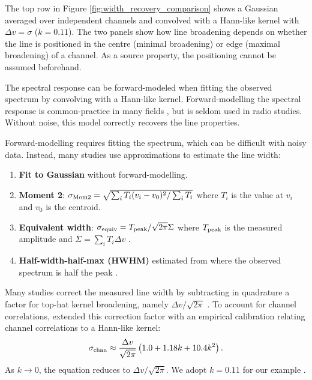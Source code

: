 \documentclass{rnaastex}
\begin{document}
The top row in Figure \ref{fig:width_recovery_comparison} shows a Gaussian averaged over independent channels and convolved with a Hann-like kernel with $\Delta v=\sigma$ ($k=0.11$).  The two panels show how line broadening depends on whether the line is positioned in the centre (minimal broadening) or edge (maximal broadening) of a channel.  As a source property, the positioning cannot be assumed beforehand.

The spectral response can be forward-modeled when fitting the observed spectrum by convolving with a Hann-like kernel.  Forward-modelling the spectral response is common-practice in many fields \citep[e.g.,][]{martin2015}, but is seldom used in radio studies.  Without noise, this model correctly recovers the line properties.

Forward-modelling requires fitting the spectrum, which can be difficult with noisy data. Instead, many studies use approximations to estimate the line width:
\begin{enumerate}
    \item {\bf Fit to Gaussian} without forward-modelling.
    \item {\bf Moment 2}: $\sigma_{\rm Mom2}=\sqrt{\sum_i T_i (v_i - v_0)^2 / \sum_i T_i}$ where $T_i$ is the value at $v_i$ and $v_0$ is the centroid.
    \item {\bf Equivalent width}: $\sigma_{\rm equiv} = T_{\rm peak} / \sqrt{2\pi} \Sigma$ where $T_{\rm peak}$ is the measured amplitude and $\Sigma= \sum_i T_i \Delta v$ \citep{heyer2001,leroy2016,sun2018}.
    \item {\bf Half-width-half-max (HWHM)} estimated from where the observed spectrum is half the peak \citep{stilp2013a,stilp2013b,koch2018}.
\end{enumerate}

Many studies correct the measured line width by subtracting in quadrature a factor for top-hat kernel broadening, namely $\Delta v / \sqrt{2\pi}$ \citep{cprops}.  To account for channel correlations, \citet{leroy2016} extended this correction factor with an empirical calibration relating channel correlations to a Hann-like kernel:
\begin{equation}
    \label{eq:leroy16_corrfact}
    \sigma_{\rm chan} \approx \frac{\Delta v}{\sqrt{2\pi}} \left( 1.0 + 1.18k + 10.4k^2 \right).
\end{equation}
As $k\rightarrow0$, the equation reduces to $\Delta v / \sqrt{2\pi}$.  We adopt $k=0.11$ for our example \citep{sun2018}.
\end{document}
